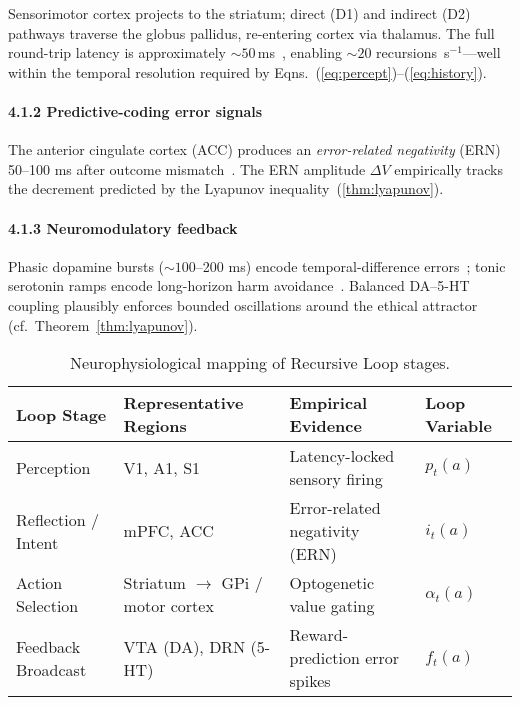 Sensorimotor cortex projects to the striatum; direct (D1) and indirect (D2)
pathways traverse the globus pallidus, re-entering cortex via thalamus.
The full round-trip latency is approximately
$\sim 50$\,ms~\cite{Schmidt2013}, enabling $\sim{}20$
recursions~s$^{-1}$---well within the temporal resolution required by
Eqns.~(\ref{eq:percept})--(\ref{eq:history}).

\paragraph{4.1.2 Predictive-coding error signals}

The anterior cingulate cortex (ACC) produces an
\emph{error-related negativity} (ERN) 50--100 ms after outcome
mismatch~\cite{Gehring2012}.
The ERN amplitude $\Delta V$ empirically tracks the decrement predicted
by the Lyapunov inequality~(\ref{thm:lyapunov}).

\paragraph{4.1.3 Neuromodulatory feedback}

Phasic dopamine bursts ($\sim{}100$--200 ms) encode temporal-difference
errors~\cite{Schultz1998};
tonic serotonin ramps encode long-horizon harm avoidance~\cite{Crockett2014}.
Balanced DA--5-HT coupling plausibly enforces bounded oscillations around
the ethical attractor (cf.\ Theorem~\ref{thm:lyapunov}).

\begin{table}[ht!]
\centering
\renewcommand{\arraystretch}{1.15}
\begin{tabular}{@{}llll@{}}
\toprule
\textbf{Loop Stage} & \textbf{Representative Regions} & \textbf{Empirical Evidence} & \textbf{Loop Variable} \\\midrule
Perception & V1, A1, S1 & Latency-locked sensory firing & $p_t(a)$ \\
Reflection / Intent & mPFC, ACC & Error-related negativity (ERN) & $i_t(a)$ \\
Action Selection & Striatum $\rightarrow$ GPi / motor cortex & Optogenetic value gating \cite{Steinberg2013} & $\alpha_t(a)$ \\
Feedback Broadcast & VTA (DA), DRN (5-HT) & Reward-prediction error spikes & $f_t(a)$ \\\bottomrule
\end{tabular}
\caption{Neurophysiological mapping of Recursive Loop stages.}
\label{tab:cstc}
\end{table}

